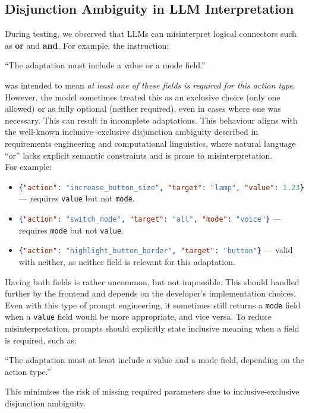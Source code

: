 \documentclass[openany]{book}
\newcommand{\mdblockquote}[1]{  \begin{myquote}  #1  \end{myquote}  }
\begin{document}
\subsection{Disjunction Ambiguity in LLM Interpretation}
During testing, we observed that LLMs can misinterpret logical connectors such as \textbf{or} and \textbf{and}. For example, the instruction:
\mdblockquote{“The adaptation must include a value or a mode field.”}
was intended to mean \textit{at least one of these fields is required for this action type}. However, the model sometimes treated this as an exclusive choice (only one allowed) or as fully optional (neither required), even in cases where one was necessary. This can result in incomplete adaptations. This behaviour aligns with the well-known inclusive–exclusive disjunction ambiguity described in requirements engineering and computational linguistics, where natural language “or” lacks explicit semantic constraints and is prone to misinterpretation. \\
For example:
\begin{itemize}
    \item \lstinline[language=json]|{"action": "increase_button_size", "target": "lamp", "value": 1.23}| — requires \texttt{value} but not \texttt{mode}.
    \item \lstinline[language=json]|{"action": "switch_mode", "target": "all", "mode": "voice"}| — requires \texttt{mode} but not \texttt{value}.
    \item \lstinline[language=json]|{"action": "highlight_button_border", "target": "button"}| — valid with neither, as neither field is relevant for this adaptation.
\end{itemize}
Having both fields is rather uncommon, but not impossible. This should handled further by the frontend and depends on the developer's implementation choices. Even with this type of prompt engineering, it sometimes still returns a \texttt{mode} field when a \texttt{value} field would be more appropriate, and vice versa.
To reduce misinterpretation, prompts should explicitly state inclusive meaning when a field is required, such as:
\mdblockquote{“The adaptation must at least include a value and a mode field, depending on the action type.”}
This minimises the risk of missing required parameters due to inclusive-exclusive disjunction ambiguity.
\end{document}
